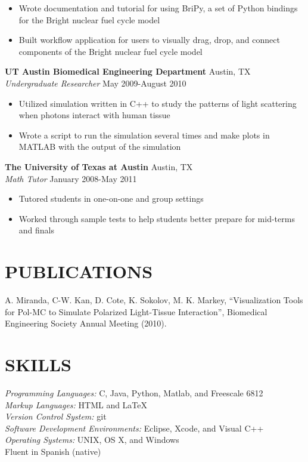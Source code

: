 \documentclass[line,margin]{res}
\begin{document}
\begin{resume}
\begin{itemize}
    \item Wrote documentation and tutorial for using BriPy, a set of Python
    bindings for the Bright nuclear fuel cycle model
    \item Built workflow application for users to visually drag, drop, and 
    connect components of the Bright nuclear fuel cycle model
  \end{itemize}
  {\bf UT Austin Biomedical Engineering Department} \hfill Austin, TX \\
  \emph{Undergraduate Researcher} \hfill May 2009-August 2010
  \begin{itemize} \itemsep -2pt
    \item Utilized simulation written in C++ to study the patterns of light 
    scattering when photons interact with human tissue
    \item Wrote a script to run the simulation several times and make plots in 
    MATLAB with the output of the simulation
  \end{itemize}
  {\bf The University of Texas at Austin} \hfill Austin, TX \\
  \emph{Math Tutor} \hfill January 2008-May 2011
  \begin{itemize} \itemsep -2pt
    \item Tutored students in one-on-one and group settings
    \item Worked through sample tests to help students better prepare for 
    mid-terms and finals
  \end{itemize}
 
\section{PUBLICATIONS} 
  A. Miranda, C-W. Kan, D. Cote, K. Sokolov, M. K. Markey, ``Visualization 
  Tools for Pol-MC to Simulate Polarized Light-Tissue Interaction'', 
  Biomedical Engineering Society Annual Meeting (2010).

\section{SKILLS}
  \emph{Programming Languages:} C, Java, Python, Matlab, and Freescale 6812 \\
  \emph{Markup Languages:} HTML and \LaTeX \\
  \emph{Version Control System:} git \\
  \emph{Software Development Environments:} Eclipse, Xcode, and Visual C++ \\
  \emph{Operating Systems:} UNIX, OS X, and Windows \\
  Fluent in Spanish (native)

\end{resume}
\end{document}
